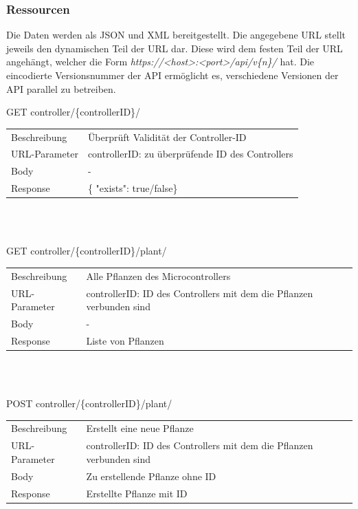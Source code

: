         \subsubsection{Ressourcen}
        Die Daten werden als JSON und XML bereitgestellt. Die angegebene URL stellt jeweils den dynamischen Teil der URL dar. Diese wird dem festen Teil der URL angehängt, welcher die Form \textit{https://<host>:<port>/api/v\{n\}/} hat. Die eincodierte Versionsnummer der API ermöglicht es, verschiedene Versionen der API parallel zu betreiben.\\
        
        \newcommand{\tabitem}{~~\llap{\textbullet}~~}
     \begin{minipage}{\textwidth}
             GET controller/\{controllerID\}/ 
        
          \begin{tabularx}{\textwidth}{lX}
                \toprule Beschreibung & Überprüft Validität der Controller-ID \\
                URL-Parameter & controllerID: zu überprüfende ID des Controllers \\
                Body & - \\
                Response & \{ "exists": true/false\}
            \end{tabularx}
    \end{minipage}\\\\
        
     \begin{minipage}{\textwidth}
            GET controller/\{controllerID\}/plant/ 

          \begin{tabularx}{\textwidth}{lX}
                \toprule Beschreibung & Alle Pflanzen des Microcontrollers \\
                URL-Parameter & controllerID: ID des Controllers mit dem die Pflanzen verbunden sind \\
                Body & - \\
                Response & Liste von Pflanzen
            \end{tabularx}
    \end{minipage}\\\\
        
     \begin{minipage}{\textwidth}
             POST  controller/\{controllerID\}/plant/ 
         
          \begin{tabularx}{\textwidth}{lX}
             \toprule Beschreibung & Erstellt eine neue Pflanze \\
             URL-Parameter & controllerID: ID des Controllers mit dem die Pflanzen verbunden sind \\
             Body & Zu erstellende Pflanze ohne ID \\
             Response & Erstellte Pflanze mit ID
         \end{tabularx}
    \end{minipage}\\\\
     
